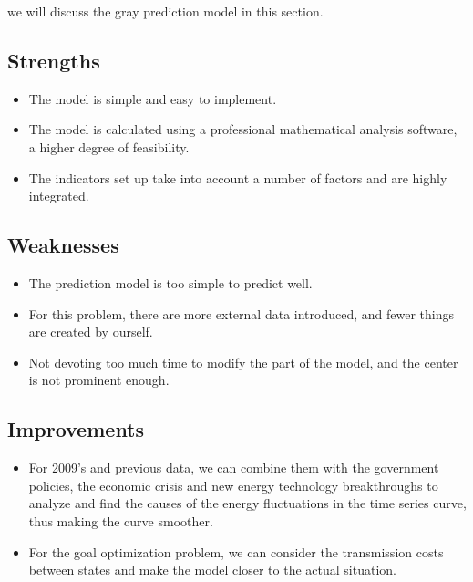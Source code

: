 \documentclass{mcmthesis}
\newcommand{\rmnum}[1]{\romannumeral #1}
\begin{document}
we will discuss the gray prediction model in this section.
\subsection{Strengths}
\begin{itemize}
  \item The model is simple and easy to implement.
  \item The model is calculated using a professional mathematical analysis software, a higher degree of feasibility.
  \item The indicators set up take into account a number of factors and are highly integrated.
\end{itemize}
\subsection{Weaknesses}
\begin{itemize}
  \item The prediction model is too simple to predict well.
  \item For this problem, there are more external data introduced, and fewer things are created by ourself.
  \item Not devoting too much time to modify the part of the model, and the center is not prominent enough.
\end{itemize}
\subsection{Improvements}
\begin{itemize}
  \item For 2009's and previous data, we can combine them with the government policies, the economic crisis and new energy technology breakthroughs to analyze and find the causes of the energy fluctuations in the time series curve, thus making the curve smoother.
  \item For the goal optimization problem, we can consider the transmission costs between states and make the model closer to the actual situation.
\end{itemize}
\newpage
\setcounter{page}{2}
\pagestyle{fancy} 
\rhead{\small\sffamily  \rmnum{\thepage}}



\end{document}
